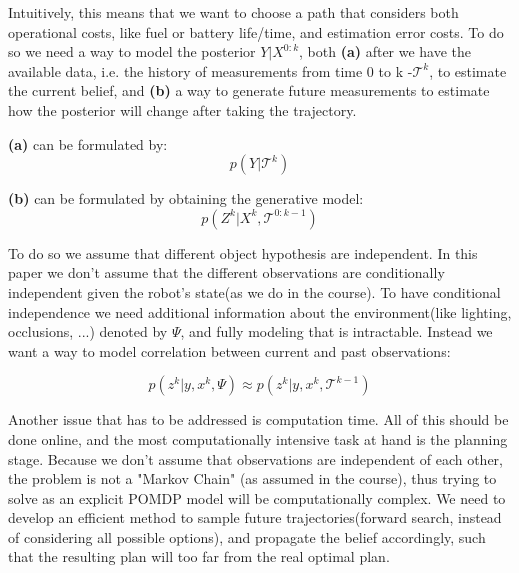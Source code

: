 \documentclass{article}
\begin{document}
	Intuitively, this means that we want to choose a path that considers both operational costs, like fuel or battery life/time, and estimation error costs.
	To do so we need a way to model the posterior $Y|X^{0:k}$, both \textbf{(a)} after we have the available data, i.e. the history of measurements from time 0 to k -$\mathcal{T}^k$, to estimate the current belief,
	and \textbf{(b)} a way to generate future measurements to estimate how the posterior will change after taking the trajectory.
	
	\textbf{(a)} can be formulated by:
	\begin{equation}
	p(Y|\mathcal{T}^k)
	\end{equation}
	
	\textbf{(b)} can be formulated by obtaining the generative model:
	\begin{equation}
	p(Z^k|X^k,\mathcal{T}^{0:k-1})
	\end{equation}
	
	To do so we assume that different object hypothesis are independent. In this paper we don't assume that the different observations are conditionally independent given the robot's state(as we do in the course). To have conditional independence we need additional information about the environment(like lighting, occlusions, ...) denoted by $\Psi$, and fully modeling that is intractable. Instead we want a way to model correlation between current and past observations:
	
	\begin{equation}
	p(z^k|y,x^k,\Psi) \approx p(z^k|y,x^k,\mathcal{T}^{k-1})
	\end{equation}
	
	Another issue that has to be addressed is computation time. All of this should be done online, and the most computationally intensive task at hand is the planning stage. Because we don't assume that observations are independent of each other, the problem is not a "Markov Chain" (as assumed in the course), thus trying to solve as an explicit POMDP model will be computationally complex. We need to develop an efficient method to sample future trajectories(forward search, instead of considering all possible options), and propagate the belief accordingly, such that the resulting plan will too far from the real optimal plan.
	
\end{document}

